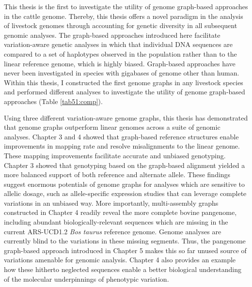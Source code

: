 \documentclass[../main.tex]{subfiles}
\begin{document}
\fi


\graphicspath{{figure/}{../figure/}}

\clearpage
\onehalfspacing

\linespread{1.25}
\setlength{\parskip}{\baselineskip}

\normalsize


This thesis is the first to investigate the utility of genome graph-based approaches in the cattle genome. Thereby, this thesis offers a novel paradigm in the analysis of livestock genomes through accounting for genetic diversity in all subsequent genomic analyses. The graph-based approaches introduced here facilitate variation-aware genetic analyses in which that individual DNA sequences are compared to a set of haplotypes observed in the population rather than to the linear reference genome, which is highly biased. Graph-based approaches have never been investigated in species with gigabases of genome other than human. Within this thesis, I constructed the first genome graphs in any livestock species and performed different analyses to investigate the utility of genome graph-based approaches (Table \ref{tab51:comp}).  

Using three different variation-aware genome graphs, this thesis has demonstrated  that genome graphs outperform linear genomes across a suite of genomic analyses. Chapter 3 and 4 showed that graph-based reference structures enable improvements in mapping rate and resolve misalignments to the linear genome. These mapping improvements facilitate accurate and unbiased genotyping. Chapter 3 showed that genotyping based on the graph-based alignment yielded a more balanced support of both reference and alternate allele. These findings suggest enormous potentials of genome graphs for analyses which are sensitive to allelic dosage, such as allele-specific expression studies that can leverage complete variations in an unbiased way. More importantly, multi-assembly graphs constructed in Chapter 4 readily reveal the more complete bovine pangenome, including abundant biologically-relevant sequences which are missing in the current ARS-UCD1.2 \emph{Bos taurus} reference genome. Genome analyses are currently blind to the variations in these missing segments. Thus, the pangenome graph-based approach introduced in Chapter 5 makes this so far unused source of variations amenable for genomic analysis. Chapter 4 also provides an example how these hitherto neglected sequences enable a better biological understanding of the molecular underpinnings of phenotypic variation. 
\end{document}
